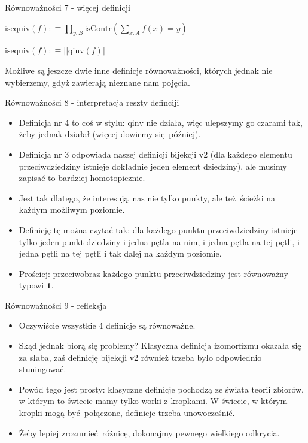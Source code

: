 \documentclass{beamer}
\newcommand{\defn}{:\equiv}
\newcommand{\qinv}{\text{qinv}}
\newcommand{\isequiv}{\text{isequiv}}
\begin{document}
\begin{frame}{Równoważności 7 - więcej definicji}

\begin{definition}[Równoważność 3]
$
\displaystyle
	\isequiv(f) \defn
		\prod_{y : B} \text{isContr}\left(\sum_{x : A} f(x) = y\right)
$
\end{definition}


\begin{definition}[Równoważność 4]
$
\displaystyle
	\isequiv(f) \defn ||\qinv(f)||
$
\end{definition}

Możliwe są jeszcze dwie inne definicje równoważności, których jednak nie wybierzemy, gdyż zawierają nieznane nam pojęcia.

\end{frame}

\begin{frame}{Równoważności 8 - interpretacja reszty definciji}
\begin{itemize}
	\item Definicja nr 4 to coś w stylu: $\qinv$ nie działa, więc ulepszymy go czarami tak, żeby jednak działał (więcej dowiemy się później).
	\item Definicja nr 3 odpowiada naszej definicji bijekcji v2 (dla każdego elementu przeciwdziedziny istnieje dokładnie jeden element dziedziny), ale musimy zapisać to bardziej homotopicznie.
	\item Jest tak dlatego, że interesują nas nie tylko punkty, ale też ścieżki na każdym możliwym poziomie.
	\item Definicję tę można czytać tak: dla każdego punktu przeciwdziedziny istnieje tylko jeden punkt dziedziny i jedna pętla na nim, i jedna pętla na tej pętli, i jedna pętli na tej pętli i tak dalej na każdym poziomie.
	\item Prościej: przeciwobraz każdego punktu przeciwdziedziny jest równoważny typowi $\mathbf{1}$.
\end{itemize}
\end{frame}

\begin{frame}{Równoważności 9 - refleksja}
\begin{itemize}
	\item Oczywiście wszystkie 4 definicje są równoważne.
	\item Skąd jednak biorą się problemy? Klasyczna definicja izomorfizmu okazała się za słaba, zaś definicję bijekcji v2 również trzeba było odpowiednio stuningować.
	\item Powód tego jest prosty: klasyczne definicje pochodzą ze świata teorii zbiorów, w którym to świecie mamy tylko worki z kropkami. W świecie, w którym kropki mogą być połączone, definicje trzeba unowocześnić.
	\item Żeby lepiej zrozumieć różnicę, dokonajmy pewnego wielkiego odkrycia.
\end{itemize}
\end{frame}
\end{document}
